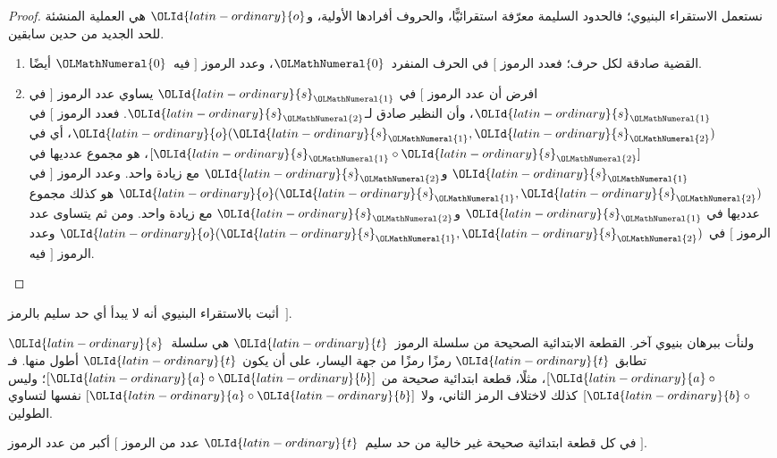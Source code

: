 \documentclass[../../../include/open-logic-section]{subfiles}
\begin{document}
\begin{proof}
نستعمل الاستقراء البنيوي؛ فالحدود السليمة معرّفة استقرائيًّا، والحروف
أفرادها الأولية، و${\OLId{latin-ordinary}{o}}$ هي العملية المنشئة للحد الجديد من حدين سابقين.
\begin{enumerate}
\item القضية صادقة لكل حرف؛ فعدد الرموز $[$ في الحرف المنفرد~${\OLMathNumeral{0}}$،
  وعدد الرموز $]$ فيه~${\OLMathNumeral{0}}$ أيضًا.
\item افرض أن عدد الرموز $[$ في ${\OLId{latin-ordinary}{s}}_{\OLMathNumeral{1}}$ يساوي عدد الرموز $]$ في
  ${\OLId{latin-ordinary}{s}}_{\OLMathNumeral{1}}$، وأن النظير صادق لـ${\OLId{latin-ordinary}{s}}_{\OLMathNumeral{2}}$. فعدد الرموز $[$ في
  ${\OLId{latin-ordinary}{o}}({\OLId{latin-ordinary}{s}}_{\OLMathNumeral{1}}, {\OLId{latin-ordinary}{s}}_{\OLMathNumeral{2}})$، أي في $[{\OLId{latin-ordinary}{s}}_{\OLMathNumeral{1}} \circ {\OLId{latin-ordinary}{s}}_{\OLMathNumeral{2}}]$، هو مجموع عدديها في
  ${\OLId{latin-ordinary}{s}}_{\OLMathNumeral{1}}$ و${\OLId{latin-ordinary}{s}}_{\OLMathNumeral{2}}$ مع زيادة واحد. وعدد الرموز $]$ في
  ${\OLId{latin-ordinary}{o}}({\OLId{latin-ordinary}{s}}_{\OLMathNumeral{1}}, {\OLId{latin-ordinary}{s}}_{\OLMathNumeral{2}})$ هو كذلك مجموع عدديها في ${\OLId{latin-ordinary}{s}}_{\OLMathNumeral{1}}$ و${\OLId{latin-ordinary}{s}}_{\OLMathNumeral{2}}$ مع زيادة
  واحد. ومن ثم يتساوى عدد الرموز $[$ في ${\OLId{latin-ordinary}{o}}({\OLId{latin-ordinary}{s}}_{\OLMathNumeral{1}}, {\OLId{latin-ordinary}{s}}_{\OLMathNumeral{2}})$ وعدد الرموز
  $]$ فيه.
\end{enumerate}
\end{proof}

\begin{prob}
  أثبت بالاستقراء البنيوي أنه لا يبدأ أي حد سليم بالرمز~$]$.
\end{prob}

ولنأت ببرهان بنيوي آخر. القطعة الابتدائية الصحيحة من سلسلة الرموز~${\OLId{latin-ordinary}{t}}$
هي سلسلة~${\OLId{latin-ordinary}{s}}$ تطابق ${\OLId{latin-ordinary}{t}}$ رمزًا رمزًا من جهة اليسار، على أن يكون ${\OLId{latin-ordinary}{t}}$
أطول منها. فـ$[{\OLId{latin-ordinary}{a}} \circ {}$، مثلًا، قطعة ابتدائية صحيحة من
$[{\OLId{latin-ordinary}{a}} \circ {\OLId{latin-ordinary}{b}}]$؛ وليس $[{\OLId{latin-ordinary}{b}} \circ {}$ كذلك لاختلاف الرمز الثاني، ولا
$[{\OLId{latin-ordinary}{a}} \circ {\OLId{latin-ordinary}{b}}]$ نفسها لتساوي الطولين.

\begin{prop}
  في كل قطعة ابتدائية صحيحة غير خالية من حد سليم~${\OLId{latin-ordinary}{t}}$ عدد من الرموز $[$ أكبر من
  عدد الرموز $]$.
\end{prop}
\end{document}
